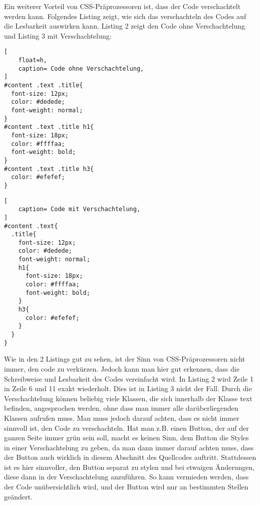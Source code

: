 Ein weiterer Vorteil von CSS-Präprozessoren ist, dass der Code verschachtelt werden kann. Folgendes Listing zeigt, wie sich das verschachteln des Codes auf die Lesbarkeit auswirken kann. Listing 2 zeigt den Code ohne Verschachtelung und Listing 3 mit Verschachtelung:\newline
\begin{lstlisting}[
	float=h,
	caption= Code ohne Verschachtelung,
]
#content .text .title{
  font-size: 12px;
  color: #dedede;
  font-weight: normal;
}
#content .text .title h1{
  font-size: 18px;
  color: #ffffaa;
  font-weight: bold;
}
#content .text .title h3{
  color: #efefef;
}
\end{lstlisting}

\begin{lstlisting}[
	caption= Code mit Verschachtelung,
]
#content .text{
  .title{
    font-size: 12px;
    color: #dedede;
    font-weight: normal;
    h1{
      font-size: 18px;
      color: #ffffaa;
      font-weight: bold;
    }
    h3{
      color: #efefef;
    }
  }
}
\end{lstlisting}

Wie in den 2 Listings gut zu sehen, ist der Sinn von CSS-Präprozessoren nicht immer, den code zu verkürzen. Jedoch kann man hier gut erkennen, dass die Schreibweise und Lesbarkeit des Codes vereinfacht wird. In Listing 2 wird Zeile 1 in Zeile 6 und 11 exakt wiederholt. Dies ist in Listing 3 nicht der Fall. Durch die Verschachtelung können beliebig viele Klassen, die sich innerhalb der Klasse text befinden, angesprochen werden, ohne dass man immer alle darüberliegenden Klassen aufrufen muss. \newline
Man muss jedoch darauf achten, dass es nicht immer sinnvoll ist, den Code zu verschachteln. Hat man z.B. einen Button, der auf der ganzen Seite immer grün sein soll, macht es keinen Sinn, dem Button die Styles in einer Verschachtelung zu geben, da man dann immer darauf achten muss, dass der Button auch wirklich in diesem Abschnitt des Quellcodes auftritt. Stattdessen ist es hier sinnvoller, den Button separat zu stylen und bei etwaigen Änderungen, diese dann in der Verschachtelung anzuführen. So kann vermieden werden, dass der Code unübersichtlich wird, und der Button wird nur an bestimmten Stellen geändert.

